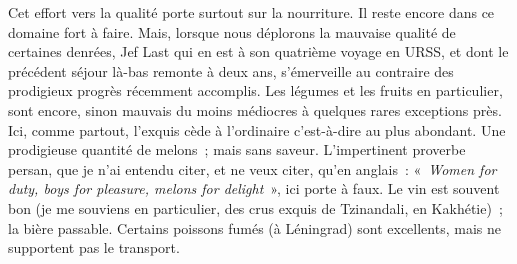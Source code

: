 \documentclass[french,twoside]{book} %
\newcommand{\astermono}{\medskip\centerline{\color{rubric}\large\selectfont{\syms ✻}}\medskip\par}%
\begin{document}
Cet effort vers la qualité porte surtout sur la nourriture. Il reste encore dans ce domaine fort à faire. Mais, lorsque nous déplorons la mauvaise qualité de certaines denrées, Jef Last qui en est à son quatrième voyage en URSS, et dont le précédent séjour là-bas remonte à deux ans, s’émerveille au contraire des prodigieux progrès récemment accomplis. Les légumes et les fruits en particulier, sont encore, sinon mauvais du moins médiocres à quelques rares exceptions près. Ici, comme partout, l’exquis cède à l’ordinaire c’est-à-dire au plus abondant. Une prodigieuse quantité de melons ; mais sans saveur. L’impertinent proverbe persan, que je n’ai entendu citer, et ne veux citer, qu’en anglais : « \emph{Women for duty, boys for pleasure, melons for delight} », ici porte à faux. Le vin est souvent bon (je me souviens en particulier, des crus exquis de Tzinandali, en Kakhétie) ; la bière passable. Certains poissons fumés (à Léningrad) sont excellents, mais ne supportent pas le transport.\par

\astermono
\end{document}

